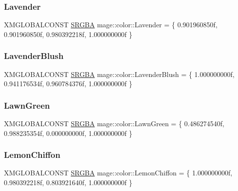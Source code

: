 \hypertarget{namespacemage_1_1color_a5ee2564ff75f8064a1f908a11ed3f2c8}{}\label{namespacemage_1_1color_a5ee2564ff75f8064a1f908a11ed3f2c8} 
\subsubsection{\texorpdfstring{Lavender}{Lavender}}
{\footnotesize\ttfamily X\+M\+G\+L\+O\+B\+A\+L\+C\+O\+N\+ST \hyperlink{structmage_1_1_s_r_g_b_a}{S\+R\+G\+BA} mage\+::color\+::\+Lavender = \{ 0.\+901960850f, 0.\+901960850f, 0.\+980392218f, 1.\+000000000f \}}

\hypertarget{namespacemage_1_1color_a22195ffe66fa883105d4371f4b28af6f}{}\label{namespacemage_1_1color_a22195ffe66fa883105d4371f4b28af6f} 
\subsubsection{\texorpdfstring{Lavender\+Blush}{LavenderBlush}}
{\footnotesize\ttfamily X\+M\+G\+L\+O\+B\+A\+L\+C\+O\+N\+ST \hyperlink{structmage_1_1_s_r_g_b_a}{S\+R\+G\+BA} mage\+::color\+::\+Lavender\+Blush = \{ 1.\+000000000f, 0.\+941176534f, 0.\+960784376f, 1.\+000000000f \}}

\hypertarget{namespacemage_1_1color_aae914716f3218cd8c3558c4970577309}{}\label{namespacemage_1_1color_aae914716f3218cd8c3558c4970577309} 
\subsubsection{\texorpdfstring{Lawn\+Green}{LawnGreen}}
{\footnotesize\ttfamily X\+M\+G\+L\+O\+B\+A\+L\+C\+O\+N\+ST \hyperlink{structmage_1_1_s_r_g_b_a}{S\+R\+G\+BA} mage\+::color\+::\+Lawn\+Green = \{ 0.\+486274540f, 0.\+988235354f, 0.\+000000000f, 1.\+000000000f \}}

\hypertarget{namespacemage_1_1color_ad82a9c74c0196ac3fd75e20260dd299d}{}\label{namespacemage_1_1color_ad82a9c74c0196ac3fd75e20260dd299d} 
\subsubsection{\texorpdfstring{Lemon\+Chiffon}{LemonChiffon}}
{\footnotesize\ttfamily X\+M\+G\+L\+O\+B\+A\+L\+C\+O\+N\+ST \hyperlink{structmage_1_1_s_r_g_b_a}{S\+R\+G\+BA} mage\+::color\+::\+Lemon\+Chiffon = \{ 1.\+000000000f, 0.\+980392218f, 0.\+803921640f, 1.\+000000000f \}}

